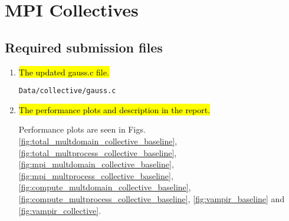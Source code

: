 
\section{MPI Collectives}
\subsection{Required submission files}
\begin{enumerate}
	\item \hl{The updated gauss.c file.}
	
	\verb!Data/collective/gauss.c!

	\item \hl{The performance plots and description in the report.}
		
	Performance plots are seen in Figs. \ref{fig:total_multdomain_collective_baseline}, \ref{fig:total_multprocess_collective_baseline}, \ref{fig:mpi_multdomain_collective_baseline},
	\ref{fig:mpi_multprocess_collective_baseline}, \ref{fig:compute_multdomain_collective_baseline},
	\ref{fig:compute_multprocess_collective_baseline}, \ref{fig:vampir_baseline} and \ref{fig:vampir_collective}.

\end{enumerate}

